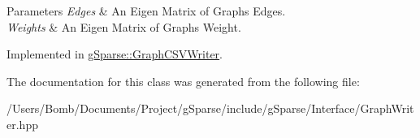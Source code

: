 \begin{DoxyParams}{Parameters}
{\em Edges} & An Eigen Matrix of Graph\textquotesingle{}s Edges. \\
\hline
{\em Weights} & An Eigen Matrix of Graph\textquotesingle{}s Weight. \\
\hline
\end{DoxyParams}


Implemented in \mbox{\hyperlink{classg_sparse_1_1_graph_c_s_v_writer_a66e9fe4e8887abca81d6d0090b217950}{g\+Sparse\+::\+Graph\+C\+S\+V\+Writer}}.



The documentation for this class was generated from the following file\+:\begin{DoxyCompactItemize}
\item 
/\+Users/\+Bomb/\+Documents/\+Project/g\+Sparse/include/g\+Sparse/\+Interface/Graph\+Writer.\+hpp\end{DoxyCompactItemize}
